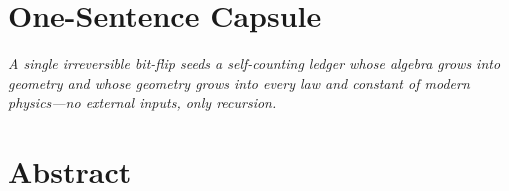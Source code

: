 \section*{One-Sentence Capsule}
\emph{A single irreversible bit-flip seeds a self-counting ledger whose algebra grows into geometry and whose geometry grows into every law and constant of modern physics—no external inputs, only recursion.}

\bigskip
\section*{Abstract}
\lipsum[1]
\clearpage 